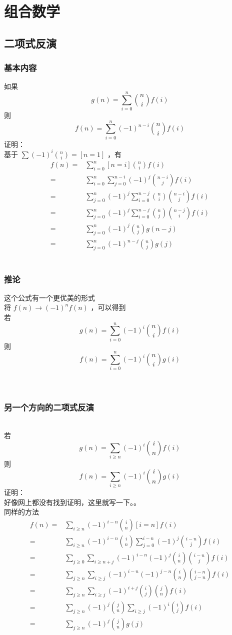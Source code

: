 %
%
	\newpage
	\section{组合数学}
	\subsection{二项式反演}	
	\subsubsection{基本内容}
	如果
	$$
	g(n)=\sum_{i=0}^n\binom{n}{i}f(i)
	$$
	则
	$$
	f(n)=\sum_{i=0}^n(-1)^{n-i}\binom nif(i)
	$$
	证明：\\
	基于 $\sum(-1)^i \binom ni=[n=1]$ ，有
	$$
	\begin{aligned}
	f(n)=&\sum_{i=0}^n[n=i]\binom nif(i)
	\\=&\sum_{i=0}^n\sum_{j=0}^{n-i}(-1)^j\binom{n-i}jf(i)
	\\=&\sum_{j=0}^n(-1)^j\sum_{i=0}^{n-j}\binom ni\binom{n-i}jf(i)
	\\=&\sum_{j=0}^n(-1)^j\sum_{i=0}^{n-j}\binom nj \binom {n-j}if(i)
	\\=&\sum_{j=0}^n(-1)^j\binom njg(n-j)
	\\=&\sum_{j=0}^n (-1)^{n-j}\binom njg(j)
	\end{aligned}
	$$\\
	\subsubsection{推论}这个公式有一个更优美的形式\\
	将 $f(n)\rightarrow(-1)^nf(n)$ ，可以得到\\
	若
	$$
	g(n)=\sum_{i=0}^n(-1)^i\binom nif(i)
	$$
	则
	$$
	f(n)=\sum_{i=0}^n(-1)^i\binom nig(i)
	$$\\
	~\\	
	\subsubsection{另一个方向的二项式反演}~\\
	若
	$$
	g(n)=\sum_{i\ge n}(-1)^{i}\binom in f(i)
	$$
	则
	$$
	f(n)=\sum_{i\ge n}(-1)^{i}\binom in g(i)
	$$
	证明：\\
	好像网上都没有找到证明，这里就写一下。。\\
	同样的方法\\
	$$
	\begin{aligned}
	f(n)=&\sum_{i\ge n}(-1)^{i-n}\binom in[i=n]f(i)
	\\=&\sum_{i\ge n}(-1)^{i-n}\binom in\sum_{j=0}^{i-n}(-1)^j\binom{i-n}j f(i)
	\\=&\sum_{j\ge 0}\sum_{i\ge n+j}(-1)^{i-n}(-1)^j\binom in\binom{i-n}jf(i)
	\\=&\sum_{j\ge n}\sum_{i\ge j}(-1)^{i-n}(-1)^{j-n} \binom in\binom{i-n}{j-n}f(i)
	\\=&\sum_{j\ge n}\sum_{i\ge j}(-1)^{i+j}\binom ij \binom jnf(i)
	\\=&\sum_{j\ge n}(-1)^j\binom jn\sum_{i\ge j}(-1)^i\binom ijf(i)
	\\=&\sum_{j\ge n}(-1)^j\binom jng(j)
	\end{aligned}
	$$
	\newpage
